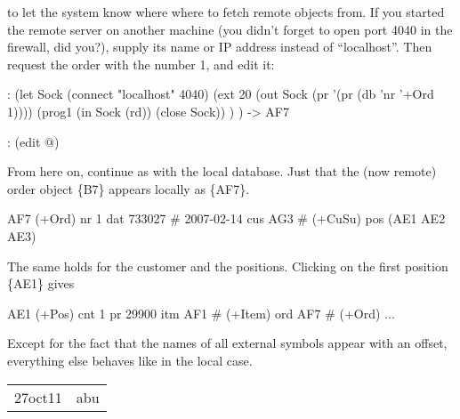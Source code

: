 to let the system know where where to fetch remote objects from.
 If you started the remote server on another machine (you didn't forget
to open port 4040 in the firewall, did you?), supply its name or IP
address instead of ``localhost''.
 Then request the order with the number 1, and edit it:


\begin{wideverbatim}
: (let Sock (connect "localhost" 4040)
   (ext 20
      (out Sock (pr '(pr (db 'nr '+Ord 1))))
      (prog1 (in Sock (rd)) (close Sock)) ) )
-> {AF7}

: (edit @)
\end{wideverbatim}

From here on, continue as with the local database. Just that the (now
remote) order object \{B7\} appears locally as \{AF7\}.


\begin{wideverbatim}
{AF7} (+Ord)
   nr 1
   dat 733027  # 2007-02-14
   cus {AG3}  # (+CuSu)
   pos ({AE1} {AE2} {AE3})
\end{wideverbatim}

The same holds for the customer and the positions. Clicking on the first
position \{AE1\} gives


\begin{wideverbatim}
{AE1} (+Pos)
   cnt 1
   pr 29900
   itm {AF1}  # (+Item)
   ord {AF7}  # (+Ord)
...
\end{wideverbatim}

Except for the fact that the names of all external symbols appear with
an offset, everything else behaves like in the local case.


\begin{center}
\begin{tabular}{ll}
 27oct11  &  abu  \\
\end{tabular}
\end{center}


